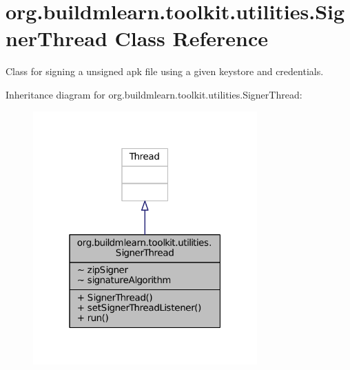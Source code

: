 \hypertarget{classorg_1_1buildmlearn_1_1toolkit_1_1utilities_1_1SignerThread}{\section{org.\-buildmlearn.\-toolkit.\-utilities.\-Signer\-Thread Class Reference}
\label{classorg_1_1buildmlearn_1_1toolkit_1_1utilities_1_1SignerThread}
}


Class for signing a unsigned apk file using a given keystore and credentials.  




Inheritance diagram for org.\-buildmlearn.\-toolkit.\-utilities.\-Signer\-Thread\-:
\nopagebreak
\begin{figure}[H]
\begin{center}
\leavevmode
\includegraphics[width=244pt]{d7/dc0/classorg_1_1buildmlearn_1_1toolkit_1_1utilities_1_1SignerThread__inherit__graph}
\end{center}
\end{figure}


